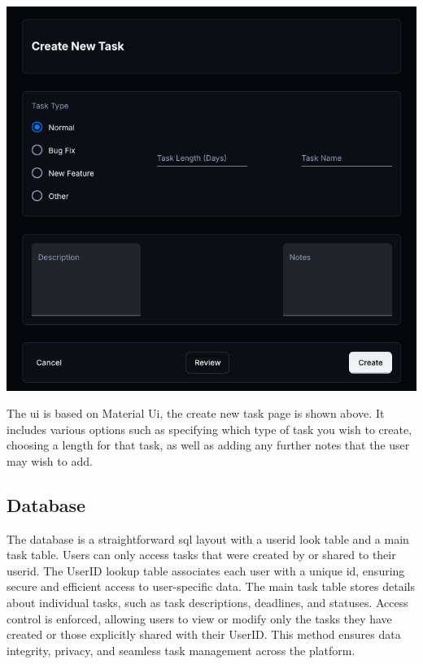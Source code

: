 \documentclass{article}
\begin{document}
\includegraphics[width=0.9\linewidth]{./logo/mockup.png} 

The \Gls{ui} is based on Material Ui\cite{mui}, the create new task page is shown above. It includes various options such as specifying which type of task you wish to create, choosing a length for that task, as well as adding any further notes that the user may wish to add.

\subsection{Database}
The database is a straightforward \Gls{sql} layout with a userid look table and a main task table. Users can only access tasks that were created by or shared to their userid. The UserID lookup table associates each user with a unique id, ensuring secure and efficient access to user-specific data. The main task table stores details about individual tasks, such as task descriptions, deadlines, and statuses. Access control is enforced, allowing users to view or modify only the tasks they have created or those explicitly shared with their UserID. This method ensures data integrity, privacy, and seamless task management across the platform.


\pagebreak
\printglossaries

\printbibliography
\end{document}
